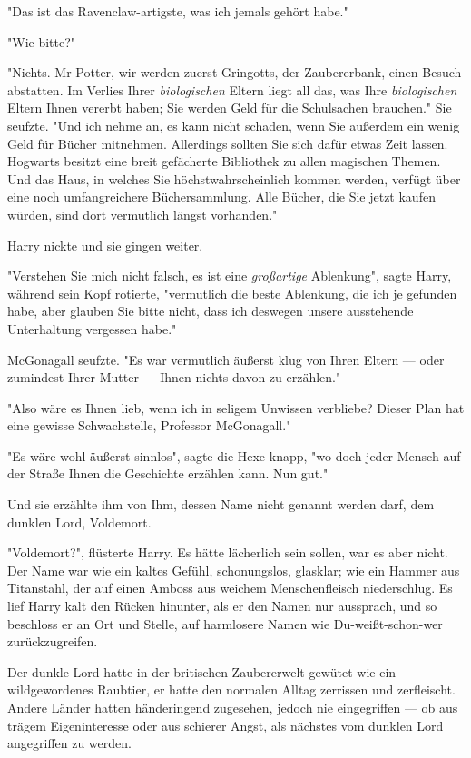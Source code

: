 {"Das ist das Ravenclaw-artigste, was ich jemals gehört habe."

"Wie bitte?"

"Nichts. Mr Potter, wir werden zuerst Gringotts, der Zaubererbank, einen Besuch abstatten. Im Verlies Ihrer \emph{biologischen} Eltern liegt all das, was Ihre \emph{biologischen} Eltern Ihnen vererbt haben; Sie werden Geld für die Schulsachen brauchen." Sie seufzte. "Und ich nehme an, es kann nicht schaden, wenn Sie außerdem ein wenig Geld für Bücher mitnehmen. Allerdings sollten Sie sich dafür etwas Zeit lassen. Hogwarts besitzt eine breit gefächerte Bibliothek zu allen magischen Themen. Und das Haus, in welches Sie höchstwahrscheinlich kommen werden, verfügt über eine noch umfangreichere Büchersammlung. Alle Bücher, die Sie jetzt kaufen würden, sind dort vermutlich längst vorhanden."

Harry nickte und sie gingen weiter.

"Verstehen Sie mich nicht falsch, es ist eine \emph{großartige} Ablenkung", sagte Harry, während sein Kopf rotierte, "vermutlich die beste Ablenkung, die ich je gefunden habe, aber glauben Sie bitte nicht, dass ich deswegen unsere ausstehende Unterhaltung vergessen habe."

McGonagall seufzte. "Es war vermutlich äußerst klug von Ihren Eltern --- oder zumindest Ihrer Mutter --- Ihnen nichts davon zu erzählen."

"Also wäre es Ihnen lieb, wenn ich in seligem Unwissen verbliebe? Dieser Plan hat eine gewisse Schwachstelle, Professor McGonagall."

"Es wäre wohl äußerst sinnlos", sagte die Hexe knapp, "wo doch jeder Mensch auf der Straße Ihnen die Geschichte erzählen kann. Nun gut."

Und sie erzählte ihm von Ihm, dessen Name nicht genannt werden darf, dem dunklen Lord, Voldemort.

"Voldemort?", flüsterte Harry. Es hätte lächerlich sein sollen, war es aber nicht. Der Name war wie ein kaltes Gefühl, schonungslos, glasklar; wie ein Hammer aus Titanstahl, der auf einen Amboss aus weichem Menschenfleisch niederschlug. Es lief Harry kalt den Rücken hinunter, als er den Namen nur aussprach, und so beschloss er an Ort und Stelle, auf harmlosere Namen wie Du-weißt-schon-wer zurückzugreifen.

Der dunkle Lord hatte in der britischen Zaubererwelt gewütet wie ein wildgewordenes Raubtier, er hatte den normalen Alltag zerrissen und zerfleischt. Andere Länder hatten händeringend zugesehen, jedoch nie eingegriffen --- ob aus trägem Eigeninteresse oder aus schierer Angst, als nächstes vom dunklen Lord angegriffen zu werden.

}
